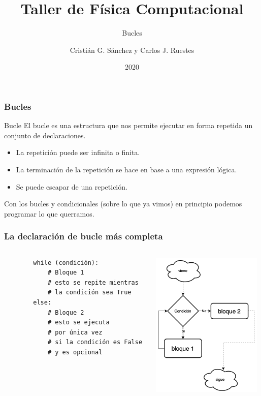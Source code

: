 \documentclass{beamer}
\title{Taller de Física Computacional}
\subtitle{Bucles}
\author{Cristián G. Sánchez y Carlos J. Ruestes}
\date{2020}
\begin{document}
\frame{\titlepage}

\begin{frame}[fragile]
    \frametitle{Bucles}
    \begin{block}{Bucle}
        El bucle es una estructura que nos permite ejecutar en forma repetida un conjunto de declaraciones.
        \begin{itemize}
            \item La repetición puede ser infinita o finita.
            \item La terminación de la repetición se hace en base a una expresión lógica.
            \item Se puede \alert{escapar} de una repetición.
        \end{itemize}
    Con los bucles y condicionales (sobre lo que ya vimos) en principio podemos programar lo que querramos.
    \end{block}
\end{frame}


\begin{frame}[fragile]
    \frametitle{La declaración de bucle más completa}

\begin{columns}
    \begin{column}{0.5\textwidth}
        \begin{verbatim}
        while (condición):
            # Bloque 1
            # esto se repite mientras
            # la condición sea True
        else:
            # Bloque 2
            # esto se ejecuta 
            # por única vez
            # si la condición es False
            # y es opcional
        \end{verbatim}
    \end{column}
    \begin{column}{0.5\textwidth}
        \begin{center}
            \includegraphics[height=7cm]{figuras/flow_while.png}           
        \end{center}    
    \end{column}

\end{columns}
 \end{frame}
\end{document}

